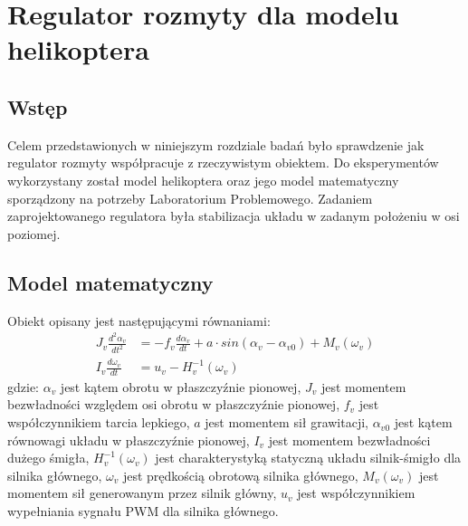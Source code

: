 \chapter{Regulator rozmyty dla modelu helikoptera}
\section{Wstęp}
Celem przedstawionych w niniejszym rozdziale badań było sprawdzenie jak regulator rozmyty współpracuje z rzeczywistym obiektem. Do eksperymentów wykorzystany został model helikoptera oraz jego model matematyczny sporządzony na potrzeby Laboratorium Problemowego. Zadaniem zaprojektowanego regulatora była stabilizacja układu w zadanym położeniu w osi poziomej.

\section{Model matematyczny}
Obiekt opisany jest następującymi równaniami:
\begin{equation}
\begin{aligned}
J_v \frac{d^2\alpha_v}{dt^2} &= -f_v\frac{d\alpha_v}{dt}+a\cdot sin(\alpha_v-\alpha_{v0})+M_v(\omega_v)\\
I_v\frac{d\omega_v}{dt} &= u_v - H_v^{-1}(\omega_v)
\end{aligned}
\label{eq:model_vertical1}
\end{equation}
\noindent gdzie:\newline
\(\alpha_v\) jest kątem obrotu w płaszczyźnie pionowej,\newline
\(J_v\) jest momentem bezwładności względem osi obrotu w płaszczyźnie pionowej,\newline
\(f_v\) jest współczynnikiem tarcia lepkiego,\newline
\(a\) jest momentem sił grawitacji,\newline
\(\alpha_{v0}\) jest kątem równowagi układu w płaszczyźnie pionowej,\newline
\(I_v\) jest momentem bezwładności dużego śmigła,\newline
\(H_v^{-1}(\omega_v)\) jest charakterystyką statyczną układu silnik-śmigło dla silnika głównego,\newline
\(\omega_v\) jest prędkością obrotową silnika głównego,\newline
\(M_v(\omega_v)\) jest momentem sił generowanym przez silnik główny,\newline
\(u_v\) jest współczynnikiem wypełniania sygnału PWM dla silnika głównego.\\\\
